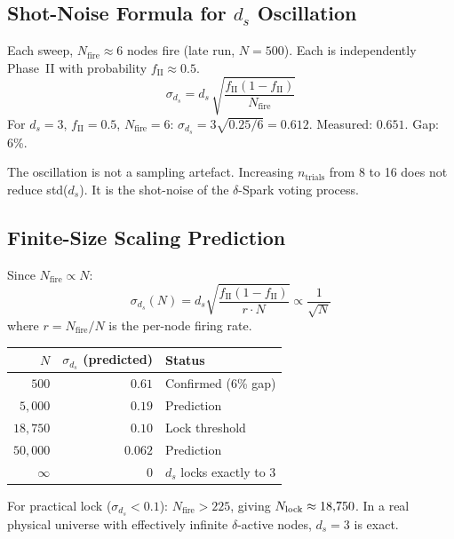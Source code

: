\documentclass[12pt, a4paper]{article}
\begin{document}
\subsection{Shot-Noise Formula for $d_s$ Oscillation}

\begin{derivedbox}[title={Shot-Noise Formula (Derived, gap 6\%)}]
Each sweep, $N_{\mathrm{fire}}\approx 6$ nodes fire (late run, $N=500$).
Each is independently Phase~II with probability $f_{\mathrm{II}}\approx 0.5$.
\begin{equation}
  \sigma_{d_s} = d_s\,\sqrt{\frac{f_{\mathrm{II}}(1-f_{\mathrm{II}})}{N_{\mathrm{fire}}}}
  \label{eq:shot_noise_X}
\end{equation}
For $d_s=3$, $f_{\mathrm{II}}=0.5$, $N_{\mathrm{fire}}=6$:
$\sigma_{d_s} = 3\sqrt{0.25/6} = 0.612$. Measured: $0.651$. Gap: 6\%.

The oscillation is not a sampling artefact. Increasing $n_{\mathrm{trials}}$ from 8 to 16 does not reduce std($d_s$). It is the shot-noise of the $\delta$-Spark voting process.
\end{derivedbox}

\subsection{Finite-Size Scaling Prediction}

\begin{derivedbox}[title={Finite-Size Scaling (Testable Prediction)}]
Since $N_{\mathrm{fire}}\propto N$:
\begin{equation}
  \sigma_{d_s}(N) = d_s\sqrt{\frac{f_{\mathrm{II}}(1-f_{\mathrm{II}})}{r\cdot N}} \propto \frac{1}{\sqrt{N}}
  \label{eq:finite_size_X}
\end{equation}
where $r=N_{\mathrm{fire}}/N$ is the per-node firing rate.

\begin{center}
\renewcommand{\arraystretch}{1.5}
\begin{tabular}{rrl}
\toprule
$N$ & $\sigma_{d_s}$ (predicted) & Status\\
\midrule
$500$ & $0.61$ & Confirmed (6\% gap)\\
$5{,}000$ & $0.19$ & Prediction\\
$18{,}750$ & $0.10$ & Lock threshold\\
$50{,}000$ & $0.062$ & Prediction\\
$\infty$ & $0$ & $d_s$ locks exactly to 3\\
\bottomrule
\end{tabular}
\end{center}

For practical lock ($\sigma_{d_s}<0.1$): $N_{\mathrm{fire}}>225$, giving $N_{\rm lock}\approx 18{,}750$.
In a real physical universe with effectively infinite $\delta$-active nodes, $d_s=3$ is exact.
\end{derivedbox}
\end{document}
